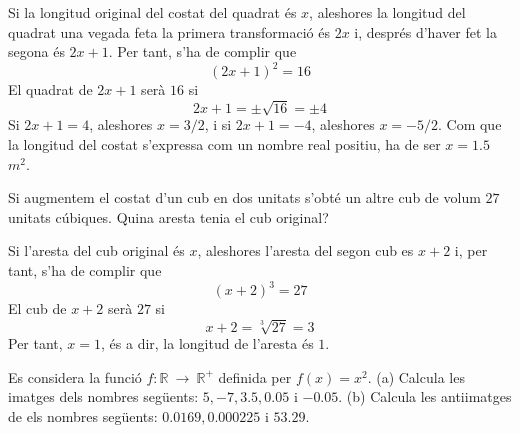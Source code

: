 \begin{solucio}
Si la longitud original del costat del quadrat és $x$, aleshores la longitud
del quadrat una vegada feta la primera transformació és $2x$ i, després d’haver fet la segona és $2x+1$. Per tant, s’ha de complir que%
\begin{equation*}
(2x+1)^{2}=16
\end{equation*}%
El quadrat de $2x+1$ serà $16$ si%
\begin{equation*}
2x+1=\pm \sqrt{16}=\pm 4
\end{equation*}%
Si $2x+1=4$, aleshores $x=3/2$, i si $2x+1=-4$, aleshores $x=-5/2$. Com que la
longitud del costat s’expressa com un nombre real positiu, ha de ser $%
x=1.5$ $m^{2}$.
\end{solucio}

\begin{exercici}
Si augmentem el costat d’un cub en dos unitats s’obté un altre cub de
volum $27$ unitats cúbiques. Quina aresta tenia el cub original?

\end{exercici}

\begin{solucio}
Si l’aresta del cub original és $x$, aleshores l’aresta del segon cub
es $x+2$ i, per tant, s’ha de complir que%
\begin{equation*}
(x+2)^{3}=27
\end{equation*}
El cub de $x+2$ serà $27$ si%
\begin{equation*}
x+2=\sqrt[3]{27}=3
\end{equation*}%
Per tant, $x=1$, és a dir, la longitud de l’aresta és $1$.
\end{solucio}

\begin{exercici}
Es considera la funció $f:\mathbb{R~}\longrightarrow ~\mathbb{R}^{+}$
definida per $f(x)=x^{2}$. (a) Calcula les imatges dels nombres
següents: $5,-7,3.5,0.05$ i $-0.05$. (b) Calcula les antiimatges de
els nombres següents: $0.0169,0.000225$ i $53.29$.

\end{exercici}

